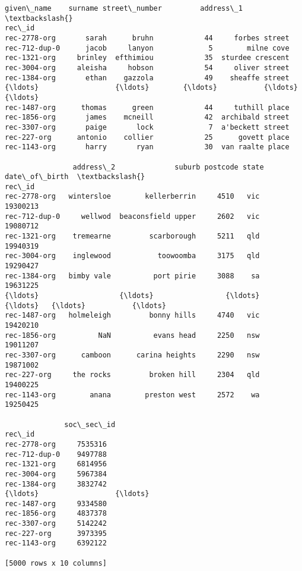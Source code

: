 \documentclass{article}
\begin{document}
    \begin{Verbatim}[commandchars=\\\{\}]

\end{Verbatim}
\begin{Verbatim}[commandchars=\\\{\}]
              given\_name    surname street\_number         address\_1  \textbackslash{}
rec\_id                                                                
rec-2778-org       sarah      bruhn            44     forbes street   
rec-712-dup-0      jacob     lanyon             5        milne cove   
rec-1321-org     brinley  efthimiou            35  sturdee crescent   
rec-3004-org     aleisha     hobson            54     oliver street   
rec-1384-org       ethan    gazzola            49    sheaffe street   
{\ldots}                  {\ldots}        {\ldots}           {\ldots}               {\ldots}   
rec-1487-org      thomas      green            44     tuthill place   
rec-1856-org       james    mcneill            42  archibald street   
rec-3307-org       paige       lock             7  a'beckett street   
rec-227-org      antonio    collier            25      govett place   
rec-1143-org       harry       ryan            30  van raalte place   

                address\_2              suburb postcode state date\_of\_birth  \textbackslash{}
rec\_id                                                                       
rec-2778-org   wintersloe        kellerberrin     4510   vic      19300213   
rec-712-dup-0     wellwod  beaconsfield upper     2602   vic      19080712   
rec-1321-org    tremearne         scarborough     5211   qld      19940319   
rec-3004-org    inglewood           toowoomba     3175   qld      19290427   
rec-1384-org   bimby vale          port pirie     3088    sa      19631225   
{\ldots}                   {\ldots}                 {\ldots}      {\ldots}   {\ldots}           {\ldots}   
rec-1487-org   holmeleigh         bonny hills     4740   vic      19420210   
rec-1856-org          NaN          evans head     2250   nsw      19011207   
rec-3307-org      camboon      carina heights     2290   nsw      19871002   
rec-227-org     the rocks         broken hill     2304   qld      19400225   
rec-1143-org        anana        preston west     2572    wa      19250425   

              soc\_sec\_id  
rec\_id                    
rec-2778-org     7535316  
rec-712-dup-0    9497788  
rec-1321-org     6814956  
rec-3004-org     5967384  
rec-1384-org     3832742  
{\ldots}                  {\ldots}  
rec-1487-org     9334580  
rec-1856-org     4837378  
rec-3307-org     5142242  
rec-227-org      3973395  
rec-1143-org     6392122  

[5000 rows x 10 columns]
\end{Verbatim}
\end{document}
